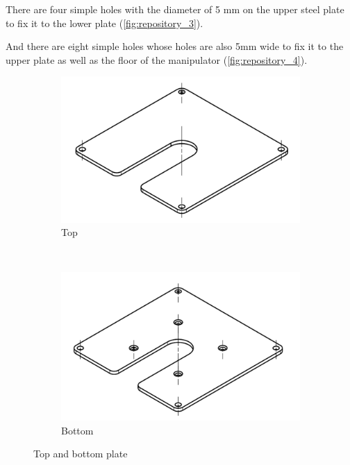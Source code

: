 \documentclass[a4paper,12pt]{scrreprt}
\begin{document}
There are four simple holes with the diameter of 5 mm on the upper steel plate to fix it to the lower plate (\autoref{fig:repository_3}).

And there are eight simple holes whose holes are also 5mm wide to fix it to the upper plate as well as the floor of the manipulator (\autoref{fig:repository_4}).
  \begin{figure} [H]
        \centering
        \begin{subfigure}[b]{0.45\textwidth}
                \centering
                \includegraphics[width=1\textwidth]{pictures/repository_3}
                \caption{Top}\label{fig:repository_3}
        \end{subfigure}%
        ~ %
        \begin{subfigure}[b]{0.45\textwidth}
                \centering
                \includegraphics[width=1\textwidth]{pictures/repository_4}
                \caption{Bottom}\label{fig:repository_4}
        \end{subfigure}
        \caption[Top and bottom plate]{Top and bottom plate}\label{fig:repository_3_4}
  \end{figure}
\end{document}
